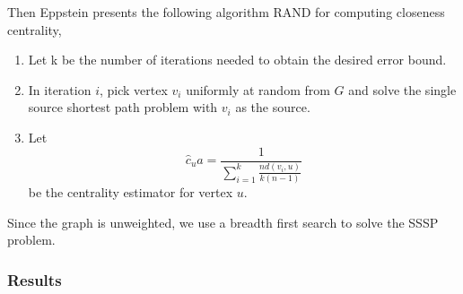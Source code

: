 \documentclass{article}
\begin{document}
Then Eppstein presents the following algorithm RAND for computing closeness centrality,
\begin{enumerate}[1.]
    \item 
    Let k be the number of iterations needed to obtain the desired error bound.

    \item
    In iteration $i$, pick vertex $v_i$ uniformly at random from $G$ and solve the single source shortest path problem with $v_i$ as the source.

    \item 
    Let
    \begin{equation*}
        \hat{c}_ua = \frac{1}{\sum^k_{i=1} \frac{n d(v_i, u)}{k(n-1)}}
    \end{equation*}
    be the centrality estimator for vertex $u$.
\end{enumerate}

Since the graph is unweighted, we use a breadth first search to solve the SSSP problem.

\subsubsection{Results}


\end{document}
